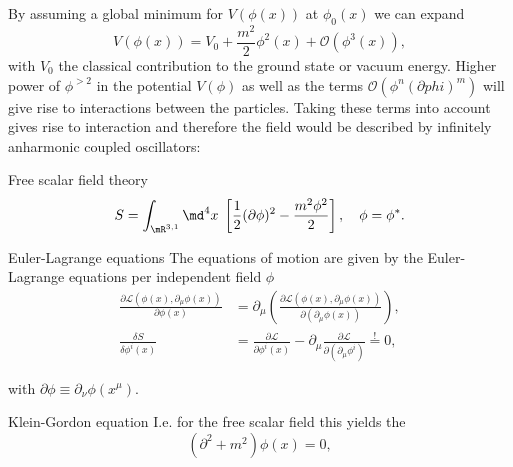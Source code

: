By assuming a global minimum for $V(\phi(x))$ at $\phi_0(x)$ we can expand 
\begin{equation}
	V(\phi(x)) = V_0 + \frac{m^2}{2} \phi^2(x) + \mathcal{O}(\phi^3(x)),
\end{equation}
with $V_0$ the classical contribution to the ground state or vacuum energy. Higher power of $\phi^{>2}$ in the potential $V(\phi)$ as well as the terms $\mathcal{O}(\phi^n(\partial phi)^m)$ will give rise to interactions between the particles. Taking these terms into account gives rise to interaction and therefore the field would be described by infinitely anharmonic coupled oscillators:
\begin{mybox}{Free scalar field theory}
	\begin{equation}
		S = \int_{\mR^{3,1}} \md^4x \; \left[\frac{1}{2} (\partial \phi)^2 - \frac{m^2 \phi^2}{2}\right],\quad \phi=\phi^*.
	\end{equation}
\end{mybox}
\begin{mybox}{Euler-Lagrange equations}
The equations of motion are given by the Euler-Lagrange equations per independent field $\phi$
\begin{align}
	\frac{\partial \mathcal{L}\left(\phi(x),\partial_{\mu}\phi(x)\right)}{\partial \phi(x)} &= \partial_{\mu} \left(\frac{\partial \mathcal{L}(\phi(x),\partial_{\mu} \phi(x))}{\partial (\partial_{\mu} \phi(x))}\right),\\
	\frac{\delta S}{\delta \phi^i(x)} &= \frac{\partial \mathcal{L}}{\partial \phi^i(x)} - \partial_{\mu} \frac{\partial \mathcal{L}}{\partial(\partial_{\mu} \phi^i)} \stackrel{!}{=}0,
\end{align}

with $\partial \phi \equiv \partial_{\nu}\phi(x^{\mu})$.
\end{mybox}

\begin{mybox}{Klein-Gordon equation}
	I.e. for the free scalar field this yields the
	\begin{equation}	
	(\partial^2+m^2) \phi(x)=0,
	\end{equation}
\end{mybox}

